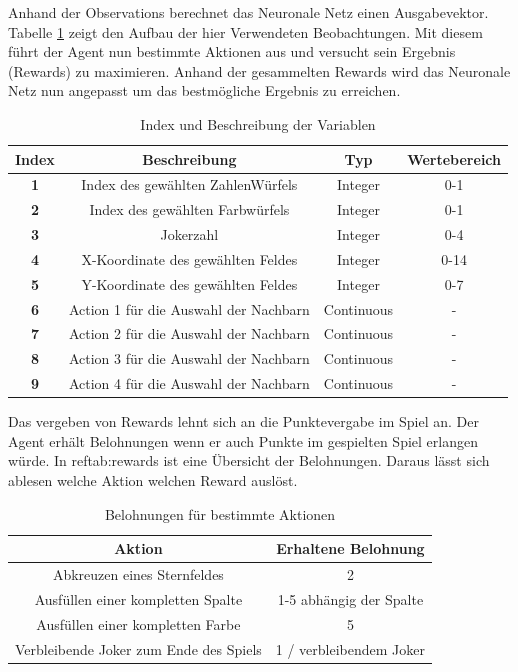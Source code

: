 Anhand der Observations berechnet das Neuronale Netz einen Ausgabevektor. Tabelle \ref{tab:Aktionbuffer} zeigt den Aufbau der hier Verwendeten Beobachtungen. Mit diesem führt der Agent nun bestimmte Aktionen aus und versucht sein Ergebnis (Rewards) zu maximieren.
Anhand der gesammelten Rewards wird das Neuronale Netz nun angepasst um das bestmögliche Ergebnis zu erreichen.

\begin{table}[!h]
    \centering
    \caption{Index und Beschreibung der Variablen}
    \begin{tabular}{|c|c|c|c|}
    \hline
    \textbf{Index} & \textbf{Beschreibung} & \textbf{Typ} & \textbf{Wertebereich} \\
    \hline
    \textbf{1} & Index des gewählten ZahlenWürfels & Integer & 0-1 \\
    \hline
    \textbf{2} & Index des gewählten Farbwürfels & Integer & 0-1 \\
    \hline
    \textbf{3} & Jokerzahl & Integer & 0-4 \\
    \hline
    \textbf{4} & X-Koordinate des gewählten Feldes & Integer & 0-14 \\
    \hline
    \textbf{5} & Y-Koordinate des gewählten Feldes & Integer & 0-7 \\
    \hline
    \textbf{6} &  Action 1 für die Auswahl der Nachbarn & Continuous & - \\
    \hline
    \textbf{7} &  Action 2 für die Auswahl der Nachbarn & Continuous & - \\
    \hline
    \textbf{8} &  Action 3 für die Auswahl der Nachbarn & Continuous & - \\
    \hline
    \textbf{9} &  Action 4 für die Auswahl der Nachbarn & Continuous & - \\
    \hline
    \end{tabular}
    \label{tab:Aktionbuffer}
\end{table}

Das vergeben von Rewards lehnt sich an die Punktevergabe im Spiel an. Der Agent erhält Belohnungen wenn er auch Punkte im gespielten Spiel erlangen würde. In ref{tab:rewards} ist eine Übersicht der Belohnungen. Daraus lässt sich ablesen welche Aktion welchen Reward auslöst.

\begin{table}[htbp]
    \centering
    \begin{tabular}{|c|c|}
    \hline
    \textbf{Aktion} & \textbf{Erhaltene Belohnung} \\
    \hline
    Abkreuzen eines Sternfeldes & 2 \\
    Ausfüllen einer kompletten Spalte & 1-5 abhängig der Spalte\\
    Ausfüllen einer kompletten Farbe & 5 \\
    Verbleibende Joker zum Ende des Spiels & 1 / verbleibendem Joker \\
    \hline
    \end{tabular}
    \caption{Belohnungen für bestimmte Aktionen}
    \label{tab:rewards}
\end{table}



